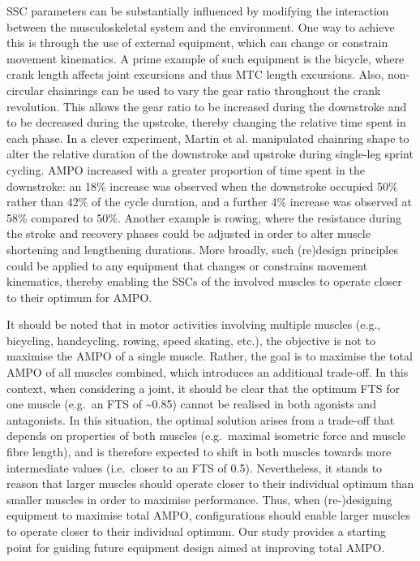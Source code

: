 \documentclass[
  10pt,
  letterpaper,
]{article}
\begin{document}
SSC parameters can be substantially influenced by modifying the
interaction between the musculoskeletal system and the environment. One
way to achieve this is through the use of external equipment, which can
change or constrain movement kinematics. A prime example of such
equipment is the bicycle, where crank length affects joint excursions
and thus MTC length excursions. Also, non-circular chainrings can be
used to vary the gear ratio throughout the crank revolution. This allows
the gear ratio to be increased during the downstroke and to be decreased
during the upstroke, thereby changing the relative time spent in each
phase. In a clever experiment, {Martin et al. \citep{martin_pedal_2002}}
manipulated chainring shape to alter the relative duration of the
downstroke and upstroke during single-leg sprint cycling. AMPO increased
with a greater proportion of time spent in the downstroke: an 18\%
increase was observed when the downstroke occupied 50\% rather than 42\%
of the cycle duration, and a further 4\% increase was observed at 58\%
compared to 50\%. Another example is rowing, where the resistance during
the stroke and recovery phases could be adjusted in order to alter
muscle shortening and lengthening durations. More broadly, such
(re)design principles could be applied to any equipment that changes or
constrains movement kinematics, thereby enabling the SSCs of the
involved muscles to operate closer to their optimum for AMPO.

It should be noted that in motor activities involving multiple muscles
(e.g., bicycling, handcycling, rowing, speed skating, etc.), the
objective is not to maximise the AMPO of a single muscle. Rather, the
goal is to maximise the total AMPO of all muscles combined, which
introduces an additional trade-off. In this context, when considering a
joint, it should be clear that the optimum FTS for one muscle (e.g.~an
FTS of \textasciitilde0.85) cannot be realised in both agonists and
antagonists. In this situation, the optimal solution arises from a
trade-off that depends on properties of both muscles (e.g.~maximal
isometric force and muscle fibre length), and is therefore expected to
shift in both muscles towards more intermediate values (i.e.~closer to
an FTS of 0.5). Nevertheless, it stands to reason that larger muscles
should operate closer to their individual optimum than smaller muscles
in order to maximise performance. Thus, when (re-)designing equipment to
maximise total AMPO, configurations should enable larger muscles to
operate closer to their individual optimum. Our study provides a
starting point for guiding future equipment design aimed at improving
total AMPO.
\end{document}
